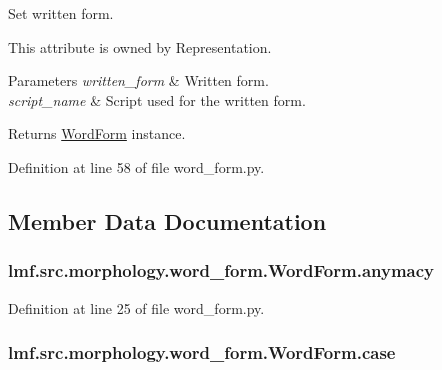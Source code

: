 Set written form. 

This attribute is owned by Representation. 
\begin{DoxyParams}{Parameters}
{\em written\+\_\+form} & Written form. \\
\hline
{\em script\+\_\+name} & Script used for the written form. \\
\hline
\end{DoxyParams}
\begin{DoxyReturn}{Returns}
\hyperlink{classlmf_1_1src_1_1morphology_1_1word__form_1_1_word_form}{Word\+Form} instance. 
\end{DoxyReturn}


Definition at line 58 of file word\+\_\+form.\+py.



\subsection{Member Data Documentation}
\hypertarget{classlmf_1_1src_1_1morphology_1_1word__form_1_1_word_form_aaf6096a08af3e92ad3878b68d2e136d3}{
\subsubsection[{anymacy}]{\setlength{\rightskip}{0pt plus 5cm}lmf.\+src.\+morphology.\+word\+\_\+form.\+Word\+Form.\+anymacy}}\label{classlmf_1_1src_1_1morphology_1_1word__form_1_1_word_form_aaf6096a08af3e92ad3878b68d2e136d3}


Definition at line 25 of file word\+\_\+form.\+py.

\hypertarget{classlmf_1_1src_1_1morphology_1_1word__form_1_1_word_form_ac996cb6a252a2e97aea0ba861982a640}{
\subsubsection[{case}]{\setlength{\rightskip}{0pt plus 5cm}lmf.\+src.\+morphology.\+word\+\_\+form.\+Word\+Form.\+case}}\label{classlmf_1_1src_1_1morphology_1_1word__form_1_1_word_form_ac996cb6a252a2e97aea0ba861982a640}


